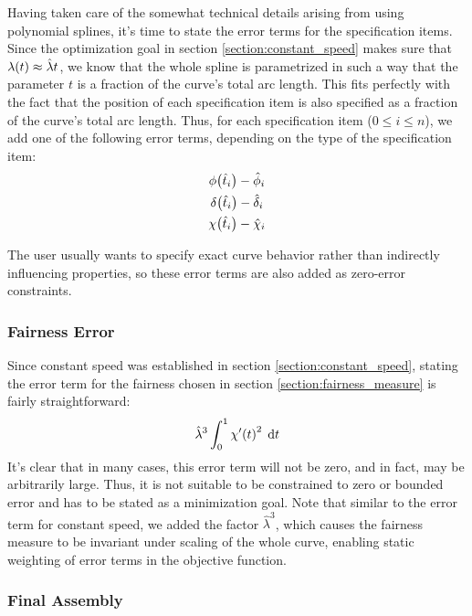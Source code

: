 \documentclass[a4paper]{article}
\begin{document}
				Having taken care of the somewhat technical details arising from using polynomial splines, it's time to state the error terms for the specification items. Since the optimization goal in section \ref{section:constant_speed} makes sure that \(\lambda\!\left( t \right) \approx \hat{\lambda}t\), we know that the whole spline is parametrized in such a way that the parameter \(t\) is a fraction of the curve's total arc length. This fits perfectly with the fact that the position of each specification item is also specified as a fraction of the curve's total arc length. Thus, for each specification item (\(0 \leq i \leq n\)), we add one of the following error terms, depending on the type of the specification item:
				\begin{equation*}
					\begin{gathered}
						\phi\!\left( \hat{t}_i \right) - \hat{\phi}_i\\
						\delta\!\left( \hat{t}_i \right) - \hat{\delta}_i\\
						\chi\!\left( \hat{t}_i \right) - \hat{\chi}_i
					\end{gathered}
				\end{equation*}

				The user usually wants to specify exact curve behavior rather than indirectly influencing properties, so these error terms are also added as zero-error constraints.

			\subsubsection{Fairness Error}
			\label{section:fairness_error}

				Since constant speed was established in section \ref{section:constant_speed}, stating the error term for the fairness chosen in section \ref{section:fairness_measure} is fairly straightforward:
				\begin{equation*}
					\hat{\lambda}^3\int_{0}^{1} \chi'\!\left( t \right)^2 \; \mathrm{d}t
				\end{equation*}
				It's clear that in many cases, this error term will not be zero, and in fact, may be arbitrarily large. Thus, it is not suitable to be constrained to zero or bounded error and has to be stated as a minimization goal. Note that similar to the error term for constant speed, we added the factor \(\hat{\lambda}^3\), which causes the fairness measure to be invariant under scaling of the whole curve, enabling static weighting of error terms in the objective function.

			\subsubsection{Final Assembly}
			\label{section:final_assembly}
\end{document}
